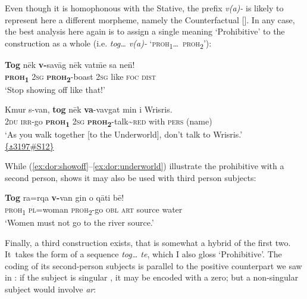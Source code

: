 \documentclass[output=paper,colorlinks,citecolor=brown,draft]{langscibook}
\begin{document}
\noindent Even though it is homophonous with the Stative, the prefix \textit{v(a)-} is likely to represent here a different morpheme, namely the Counterfactual []. In any case, the best analysis here again is to assign a single meaning ‘Prohibitive’ to the construction as a whole (i.e. \textit{tog… v(a)-} ‘\textsc{proh}\textsubscript{1}\ldots\ \textsc{proh}\textsubscript{2}’):


\ea\label{ex:dor:showoff}
    \gll \textbf{Tog} nēk \textbf{v-}savāg nēk vat\={m}e sa ne\={n}!\\
         \textbf{\textsc{proh}\textsubscript{1}} \textsc{2sg} \textbf{\textsc{proh}\textsubscript{2}}-boast \textsc{2sg} like \textsc{foc} \textsc{dist}\\
    \glt ‘Stop showing off like that!’ \quad [\textsc{af.bp3}.34b]  
\z 

\ea\label{ex:dor:underworld} 
    \gll  Kmur s-van, \textbf{tog} nēk \textbf{va}-vavgat min i Wrisris.\\ 
          \textsc{2du} \textsc{irr}-go \textbf{\textsc{proh}\textsubscript{1}} \textsc{2sg} \textbf{\textsc{proh}\textsubscript{2}}-talk\textsc{{\textasciitilde}red} with \textsc{pers} (name)\\
    \glt ‘As you walk together [to the Underworld], don’t talk to Wrisris.’ \\
     \href{https://doi.org/10.24397/pangloss-0003197#S12}{\{\texttt{⚓}3197\#S12\}}
\z 

While (\ref{ex:dor:showoff}--\ref{ex:dor:underworld}) illustrate the prohibitive with a second person,  shows it may also be used with third person subjects:


\ea\label{ex:dor:women}
    \gll \textbf{Tog} ra=rqa \textbf{v-}van gin o qāti bē!\\
         \textsc{proh\textsubscript{1}} \textsc{pl=}woman \textsc{proh\textsubscript{2}}\textsc{-}go \textsc{obl} \textsc{art} source water\\
    \glt ‘Women must not go to the river source.’ \quad [\textsc{af.bp3}.30b]
\z 

Finally, a third construction exists, that is somewhat a hybrid of the first two. It~takes the form of a sequence \textit{tog… te}, which I also gloss ‘Prohibitive’. The coding of its second-person subjects is parallel to the positive counterpart we saw in : if the subject is singular , it may be encoded with a zero; but a non-singular subject  would involve \textit{ar}: 
\end{document}
